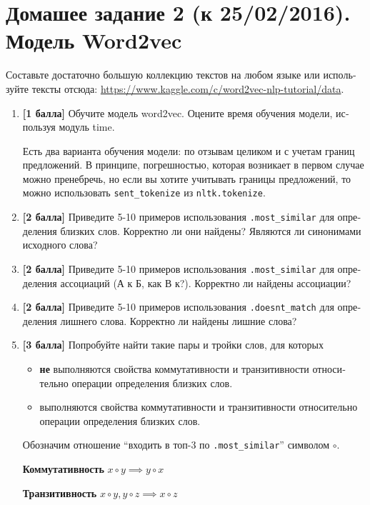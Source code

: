 \documentclass{article}
\begin{document}
\section*{\foreignlanguage{russian}{Домашее задание 2 (к 25/02/2016). Модель Word2vec}}

\foreignlanguage{russian}{Составьте достаточно большую коллекцию текстов на любом языке или используйте тексты отсюда}:
\url{https://www.kaggle.com/c/word2vec-nlp-tutorial/data}.

\begin{enumerate}
    \item \foreignlanguage{russian}{\textbf{[1 балла]} Обучите модель word2vec. Оцените время обучения модели, используя модуль time.}
    
    \foreignlanguage{russian}{Есть два варианта обучения модели: по отзывам целиком и с учетам границ предложений. В принципе, погрешностью, которая возникает в первом случае можно пренебречь, но если вы хотите учитывать границы предложений, то можно использовать \texttt{sent\_tokenize} из \texttt{nltk.tokenize}.}
    
    \item \foreignlanguage{russian}{\textbf{[2 балла]} Приведите 5-10 примеров использования \texttt{.most\_similar} для определения близких слов. Корректно ли они найдены? Являются ли синонимами исходного слова?}
    \item \foreignlanguage{russian}{\textbf{[2 балла]} Приведите 5-10 примеров использования \texttt{.most\_similar}  для определения ассоциаций (А к Б, как В к?). Корректно ли найдены ассоциации?}
    \item \foreignlanguage{russian}{\textbf{[2 балла]} Приведите 5-10 примеров использования \texttt{.doesnt\_match} для определения лишнего слова. Корректно ли найдены лишние слова?}
    \item \foreignlanguage{russian}{\textbf{[3 балла]} Попробуйте найти такие пары и тройки слов, для которых }
    \begin{itemize}
    \item \foreignlanguage{russian}{\textbf{не} выполняются свойства коммутативности и транзитивности относительно операции определения близких слов.} 
    \item \foreignlanguage{russian}{выполняются свойства коммутативности и транзитивности относительно операции определения близких слов.} 
	
    \end{itemize}

\foreignlanguage{russian}{Обозначим отношение ``входить в топ-3 по \texttt{.most\_similar}''  символом $\circ$.}

\foreignlanguage{russian}{\textbf{Коммутативность}} $x \circ y \implies y \circ x$


\foreignlanguage{russian}{\textbf{Транзитивность} $x\circ y, y \circ z \implies x \circ z$  }

\end{enumerate}
\end{document}
